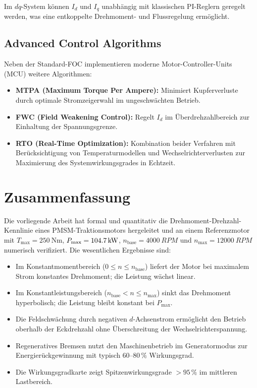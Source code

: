 ﻿\documentclass[a4paper,12pt]{article}
\theoremstyle{definition}
\begin{document}
Im $dq$-System können $I_d$ und $I_q$ unabhängig mit klassischen PI-Reglern
geregelt werden, was eine entkoppelte Drehmoment- und Flussregelung ermöglicht.

\subsection{Advanced Control Algorithms}

Neben der Standard-FOC implementieren moderne Motor-Controller-Units (MCU)
weitere Algorithmen:

\begin{itemize}
    \item \textbf{MTPA (Maximum Torque Per Ampere):} Minimiert Kupferverluste
          durch optimale Stromzeigerwahl im ungeschwächten Betrieb.
    \item \textbf{FWC (Field Weakening Control):} Regelt $I_d$ im Überdrehzahlbereich
          zur Einhaltung der Spannungsgrenze.
    \item \textbf{RTO (Real-Time Optimization):} Kombination beider Verfahren
          mit Berücksichtigung von Temperaturmodellen und Wechselrichterverlusten
          zur Maximierung des Systemwirkungsgrades in Echtzeit.
\end{itemize}

\section{Zusammenfassung}
\label{sec:zusammenfassung}

Die vorliegende Arbeit hat formal und quantitativ die Drehmoment-Drehzahl-Kennlinie
eines PMSM-Traktionsmotors hergeleitet und an einem Referenzmotor mit
$T_{\max} = \SI{250}{\newton\metre}$, $P_{\max} = \SI{104{,}7}{\kilo\watt}$,
$n_{\mathrm{base}} = \SI{4000}{RPM}$ und $n_{\max} = \SI{12000}{RPM}$ numerisch
verifiziert. Die wesentlichen Ergebnisse sind:

\begin{itemize}
    \item Im Konstantmomentbereich ($0 \leq n \leq n_{\mathrm{base}}$) liefert der
          Motor bei maximalem Strom konstantes Drehmoment; die Leistung wächst linear.
    \item Im Konstantleistungsbereich ($n_{\mathrm{base}} < n \leq n_{\max}$) sinkt
          das Drehmoment hyperbolisch; die Leistung bleibt konstant bei $P_{\max}$.
    \item Die Feldschwächung durch negativen $d$-Achsenstrom ermöglicht den Betrieb
          oberhalb der Eckdrehzahl ohne Überschreitung der Wechselrichterspannung.
    \item Regeneratives Bremsen nutzt den Maschinenbetrieb im Generatormodus zur
          Energierückgewinnung mit typisch $60$--$80\,\%$ Wirkungsgrad.
    \item Die Wirkungsgradkarte zeigt Spitzenwirkungsgrade $> 95\,\%$ im mittleren
          Lastbereich.
\end{itemize}
\end{document}
